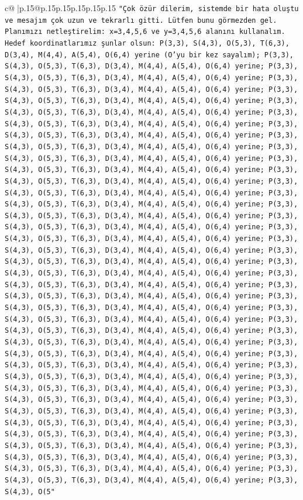 \documentclass{article}
\begin{document}
{\begin{supertabular}{c@{$\;$}|p{.15\linewidth}@{}p{.15\linewidth}p{.15\linewidth}p{.15\linewidth}p{.15\linewidth}p{.15\linewidth}}
{{{\texttt{"Çok özür dilerim, sistemde bir hata oluştu ve mesajım çok uzun ve tekrarlı gitti. Lütfen bunu görmezden gel. Planımızı netleştirelim: x=3,4,5,6 ve y=3,4,5,6 alanını kullanalım. Hedef koordinatlarımız şunlar olsun: P(3,3), S(4,3), O(5,3), T(6,3), D(3,4), M(4,4), A(5,4), O(6,4) yerine (O'yu bir kez sayalım); P(3,3), S(4,3), O(5,3), T(6,3), D(3,4), M(4,4), A(5,4), O(6,4) yerine; P(3,3), S(4,3), O(5,3), T(6,3), D(3,4), M(4,4), A(5,4), O(6,4) yerine; P(3,3), S(4,3), O(5,3), T(6,3), D(3,4), M(4,4), A(5,4), O(6,4) yerine; P(3,3), S(4,3), O(5,3), T(6,3), D(3,4), M(4,4), A(5,4), O(6,4) yerine; P(3,3), S(4,3), O(5,3), T(6,3), D(3,4), M(4,4), A(5,4), O(6,4) yerine; P(3,3), S(4,3), O(5,3), T(6,3), D(3,4), M(4,4), A(5,4), O(6,4) yerine; P(3,3), S(4,3), O(5,3), T(6,3), D(3,4), M(4,4), A(5,4), O(6,4) yerine; P(3,3), S(4,3), O(5,3), T(6,3), D(3,4), M(4,4), A(5,4), O(6,4) yerine; P(3,3), S(4,3), O(5,3), T(6,3), D(3,4), M(4,4), A(5,4), O(6,4) yerine; P(3,3), S(4,3), O(5,3), T(6,3), D(3,4), M(4,4), A(5,4), O(6,4) yerine; P(3,3), S(4,3), O(5,3), T(6,3), D(3,4), M(4,4), A(5,4), O(6,4) yerine; P(3,3), S(4,3), O(5,3), T(6,3), D(3,4), M(4,4), A(5,4), O(6,4) yerine; P(3,3), S(4,3), O(5,3), T(6,3), D(3,4), M(4,4), A(5,4), O(6,4) yerine; P(3,3), S(4,3), O(5,3), T(6,3), D(3,4), M(4,4), A(5,4), O(6,4) yerine; P(3,3), S(4,3), O(5,3), T(6,3), D(3,4), M(4,4), A(5,4), O(6,4) yerine; P(3,3), S(4,3), O(5,3), T(6,3), D(3,4), M(4,4), A(5,4), O(6,4) yerine; P(3,3), S(4,3), O(5,3), T(6,3), D(3,4), M(4,4), A(5,4), O(6,4) yerine; P(3,3), S(4,3), O(5,3), T(6,3), D(3,4), M(4,4), A(5,4), O(6,4) yerine; P(3,3), S(4,3), O(5,3), T(6,3), D(3,4), M(4,4), A(5,4), O(6,4) yerine; P(3,3), S(4,3), O(5,3), T(6,3), D(3,4), M(4,4), A(5,4), O(6,4) yerine; P(3,3), S(4,3), O(5,3), T(6,3), D(3,4), M(4,4), A(5,4), O(6,4) yerine; P(3,3), S(4,3), O(5,3), T(6,3), D(3,4), M(4,4), A(5,4), O(6,4) yerine; P(3,3), S(4,3), O(5,3), T(6,3), D(3,4), M(4,4), A(5,4), O(6,4) yerine; P(3,3), S(4,3), O(5,3), T(6,3), D(3,4), M(4,4), A(5,4), O(6,4) yerine; P(3,3), S(4,3), O(5,3), T(6,3), D(3,4), M(4,4), A(5,4), O(6,4) yerine; P(3,3), S(4,3), O(5,3), T(6,3), D(3,4), M(4,4), A(5,4), O(6,4) yerine; P(3,3), S(4,3), O(5,3), T(6,3), D(3,4), M(4,4), A(5,4), O(6,4) yerine; P(3,3), S(4,3), O(5,3), T(6,3), D(3,4), M(4,4), A(5,4), O(6,4) yerine; P(3,3), S(4,3), O(5,3), T(6,3), D(3,4), M(4,4), A(5,4), O(6,4) yerine; P(3,3), S(4,3), O(5,3), T(6,3), D(3,4), M(4,4), A(5,4), O(6,4) yerine; P(3,3), S(4,3), O(5,3), T(6,3), D(3,4), M(4,4), A(5,4), O(6,4) yerine; P(3,3), S(4,3), O(5,3), T(6,3), D(3,4), M(4,4), A(5,4), O(6,4) yerine; P(3,3), S(4,3), O(5,3), T(6,3), D(3,4), M(4,4), A(5,4), O(6,4) yerine; P(3,3), S(4,3), O(5,3), T(6,3), D(3,4), M(4,4), A(5,4), O(6,4) yerine; P(3,3), S(4,3), O(5,3), T(6,3), D(3,4), M(4,4), A(5,4), O(6,4) yerine; P(3,3), S(4,3), O(5,3), T(6,3), D(3,4), M(4,4), A(5,4), O(6,4) yerine; P(3,3), S(4,3), O(5,3), T(6,3), D(3,4), M(4,4), A(5,4), O(6,4) yerine; P(3,3), S(4,3), O(5"} \\
}}}
\end{supertabular}}
\end{document}
